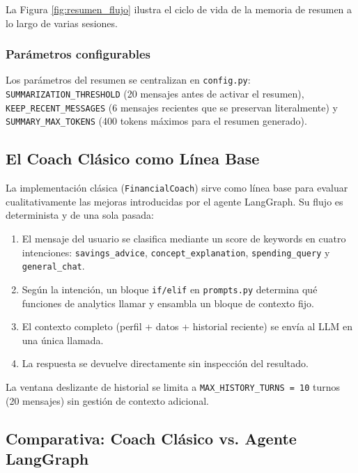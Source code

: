 La Figura \ref{fig:resumen_flujo} ilustra el ciclo de vida de la memoria de resumen a lo largo de varias sesiones.

\subsubsection{Parámetros configurables}

Los parámetros del resumen se centralizan en \texttt{config.py}: \texttt{SUMMARIZATION\_THRESHOLD} (20 mensajes antes de activar el resumen), \texttt{KEEP\_RECENT\_MESSAGES} (6 mensajes recientes que se preservan literalmente) y \texttt{SUMMARY\_MAX\_TOKENS} (400 tokens máximos para el resumen generado).

\subsection{El Coach Clásico como Línea Base}
\label{subsec:coach_clasico}

La implementación clásica (\texttt{FinancialCoach}) sirve como línea base para evaluar cualitativamente las mejoras introducidas por el agente LangGraph. Su flujo es determinista y de una sola pasada:

\begin{enumerate}
    \item El mensaje del usuario se clasifica mediante un score de keywords en cuatro intenciones: \texttt{savings\_advice}, \texttt{concept\_explanation}, \texttt{spending\_query} y \texttt{general\_chat}.
    \item Según la intención, un bloque \texttt{if/elif} en \texttt{prompts.py} determina qué funciones de analytics llamar y ensambla un bloque de contexto fijo.
    \item El contexto completo (perfil + datos + historial reciente) se envía al LLM en una única llamada.
    \item La respuesta se devuelve directamente sin inspección del resultado.
\end{enumerate}

La ventana deslizante de historial se limita a \texttt{MAX\_HISTORY\_TURNS = 10} turnos (20 mensajes) sin gestión de contexto adicional.

\subsection{Comparativa: Coach Clásico vs. Agente LangGraph}
\label{subsec:comparativa}

